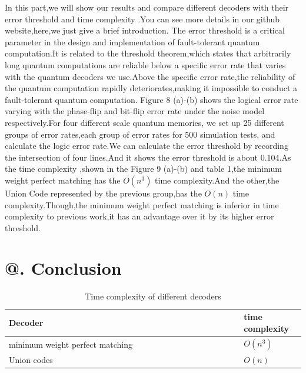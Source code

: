 \documentclass[
	a4paper, %
	10pt, %
	unnumberedsections, %
	twoside, %
]{LTJournalArticle}
\makeatletter
\newcommand{\Rmnum}[1]{\expandafter\@slowromancap\romannumeral #1@}
\makeatother
\begin{document}
	In this part,we will show our results and compare different decoders with their error threshold and time complexity .You can see more details in our github website,here,we just give a brief introduction.
	The error threshold is a critical parameter in the design and implementation of fault-tolerant quantum computation.It is related to the threshold theorem,which states that arbitrarily long quantum computations are reliable below a specific error rate that varies with the quantum decoders we use.Above the specific error rate,the reliability of the quantum computation rapidly deteriorates,making it impossible to conduct a fault-tolerant quantum computation.
	Figure 8 (a)-(b) shows the logical error rate varying with the phase-flip and bit-flip error rate under the noise model respectively.For four different scale quantum memories, we set up 25 different groups of error rates,each group of error rates for 500 simulation tests, and calculate the logic error rate.We can calculate the error threshold by recording the intersection of four lines.And it shows the error threshold is about 0.104.As the time complexity ,shown in the Figure 9 (a)-(b) and table 1,the minimum weight perfect matching has the $O(n^3)$ time complexity.And the other,the Union Code represented by the previous group,has the $O(n)$ time complexity.Though,the minimum weight perfect matching is inferior in time complexity to previous work,it has an advantage over it by its higher error threshold.
\section{\Rmnum{6}. Conclusion}
\begin{table} %
	\caption{Time complexity of different decoders}
	\centering %
	\begin{tabular}{L{1\linewidth} L{1\linewidth} R{0.15\linewidth}} %
		\toprule
		\cmidrule(r){1-2}
		Decoder & time complexity \\
		\midrule
		minimum weight perfect matching & $O(n^3)$ \\
		Union codes & $O(n)$\\
		\bottomrule
	\end{tabular}
\end{table}


\end{document}
